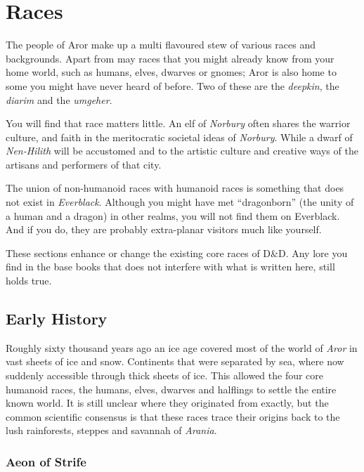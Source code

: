 \twocolumn
\section{Races}

The people of Aror make up a multi flavoured stew of various races and
backgrounds. Apart from may races that you might already know from your
home world, such as humans, elves, dwarves or gnomes; Aror is also home to some
you might have never heard of before. Two of these are the \emph{deepkin}, the
\emph{diarim} and the \emph{umgeher}.

You will find that race matters little. An elf of \emph{Norbury} often shares
the warrior culture, and faith in the meritocratic societal ideas
of \emph{Norbury}. While a dwarf of \emph{Nen-Hilith} will be accustomed and
to the artistic culture and creative ways of the artisans and performers of
that city.

The union of non-humanoid races with humanoid races is something that does
not exist in \emph{Everblack}. Although you might have met ``dragonborn''
(the unity of a human and a dragon) in other realms, you will not find them
on Everblack. And if you do, they are probably extra-planar visitors much
like yourself.

\begin{note}
These sections enhance or change the existing core races of D\&D. Any lore you
find in the base books that does not interfere with what is written here, still
holds true.
\end{note}

\subsection{Early History}

Roughly sixty thousand years ago an ice age covered most of the world
of \emph{Aror} in vast sheets of ice and snow. Continents that were separated
by sea, where now suddenly accessible through thick sheets of ice. This
allowed the four core humanoid races, the humans, elves, dwarves and halflings
to settle the entire known world. It is still unclear where they originated
from exactly, but the common scientific consensus is that these races trace
their origins back to the lush rainforests, steppes and savannah
of \emph{Arania}.

\subsubsection{Aeon of Strife}
\label{sec:Aeon of Strife}

